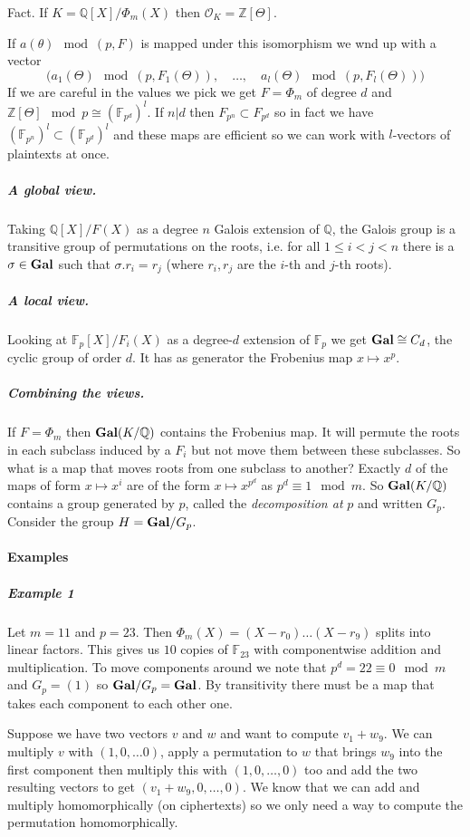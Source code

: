 \documentclass[11pt]{article}
\newcommand{\F}{\mathbb{F}}
\newcommand{\Z}{\mathbb{Z}}
\newcommand{\Q}{\mathbb{Q}}
\renewcommand{\O}{\mathcal{O}}
\newcommand{\Gal}{\textup{\textbf{Gal}}}
\begin{document}
Fact. If $K = \Q[X] / \Phi_m(X)$ then $\O_K = \Z[\Theta]$.

If $a(\theta) \mod (p, F)$ is mapped under this isomorphism we wnd up with a vector 
$$\big(a_1(\Theta) \mod (p, F_1(\Theta)), \quad \ldots, \quad a_l(\Theta) \mod (p, F_l(\Theta))\big)$$
If we are careful in the values we pick we get $F = \Phi_m$ of degree $d$ and
$\Z[\Theta] \mod p \cong (\F_{p^d})^l$. 
If $n | d$ then $F_{p^n} \subset F_{p^d}$ so in fact we have $(\F_{p^n})^l \subset (\F_{p^d})^l$ and these maps are efficient so we can work with $l$-vectors of plaintexts at once.

\subparagraph{A global view.}
Taking $\Q[X] / F(X)$ as a degree $n$ Galois extension of $\Q$, the Galois group is a transitive group of permutations on the roots, i.e. for all $1 \leq i < j < n$ there is a $\sigma \in \Gal$ such that $\sigma.r_i = r_j$ (where $r_i, r_j$ are the $i$-th and $j$-th roots).

\subparagraph{A local view.}
Looking at $\F_p[X] / F_i(X)$ as a degree-$d$ extension of $\F_p$ we get $\Gal \cong C_d$, the cyclic group of order $d$. 
It has as generator the Frobenius map $x \mapsto x^p$.

\subparagraph{Combining the views.}
If $F = \Phi_m$ then $\Gal(K/\Q)$ contains the Frobenius map.
It will permute the roots in each subclass induced by a $F_i$ but not move them between these subclasses.
So what is a map that moves roots from one subclass to another?
Exactly $d$ of the maps of form $x \mapsto x^i$ are of the form $x \mapsto x^{p^d}$ as $p^d \equiv 1 \mod m$.
So $\Gal(K/\Q)$ contains a group generated by $p$, called the \emph{decomposition at} $p$ and written $G_p$.
Consider the group $H = \Gal/G_p$.

\paragraph{Examples}

\subparagraph{Example 1}
Let $m = 11$ and $p = 23$.
Then $\Phi_m(X) = (X-r_0)\ldots(X-r_9)$ splits into linear factors.
This gives us $10$ copies of $\F_{23}$ with componentwise addition and multiplication.
To move components around we note that $p^d = 22 \equiv 0 \mod m$ and $G_p = (1)$ so $\Gal/G_p = \Gal$.
By transitivity there must be a map that takes each component to each other one.

Suppose we have two vectors $v$ and $w$ and want to compute $v_1 + w_9$.
We can multiply $v$ with $(1, 0, \ldots 0)$,
apply a permutation to $w$ that brings $w_9$ into the first component then multiply this with $(1, 0, \ldots, 0)$ too and add the two resulting vectors to get $(v_1 + w_9, 0, \ldots, 0)$.
We know that we can add and multiply homomorphically (on ciphertexts) so we only need a way to compute the permutation homomorphically.
\end{document}
